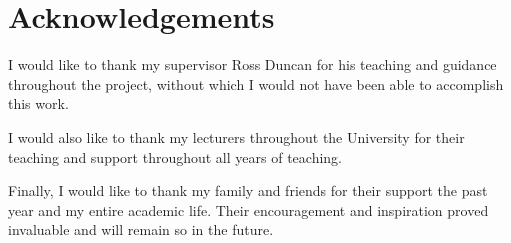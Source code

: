 \documentclass[report.tex]{subfiles}
\begin{document}
{}

\chapter*{Acknowledgements} %
\label{cha:acknowledgements}
I would like to thank my supervisor Ross Duncan for his teaching and guidance
throughout the project, without which I would not have been able to accomplish
this work.

I would also like to thank my lecturers throughout the University for their
teaching and support throughout all years of teaching.

Finally, I would like to thank my family and friends for their support the past
year and my entire academic life. Their encouragement and inspiration proved
invaluable and will remain so in the future.

\newpage
\end{document}
